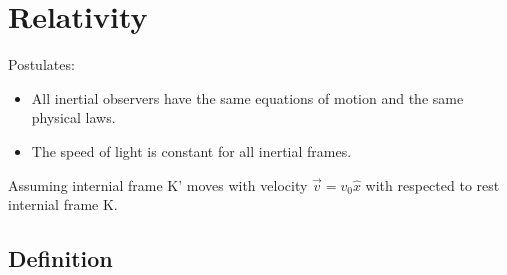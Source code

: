 \section{Relativity}

Postulates:
\begin{itemize}
    \item All inertial observers have the same equations of motion and the same physical laws.
    \item The speed of light is constant for all inertial frames.
\end{itemize}
Assuming internial frame K' moves with velocity $\vec{v} = v_0\hat{x}$ with respected to
rest internial frame K.
\subsection{Definition}
